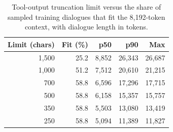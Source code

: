 \begin{table}[t]
\centering
\small
\caption{Tool-output truncation limit versus the share of sampled training dialogues that fit the 8{,}192-token context, with dialogue length in tokens.}
\label{tab:toollimit}
\setlength{\tabcolsep}{4pt}
\begin{tabular}{rrrrr}
\toprule
Limit (chars) & Fit (\%) & p50 & p90 & Max \\
\midrule
1{,}500 & 25.2 & 8{,}852 & 26{,}343 & 26{,}687 \\
1{,}000 & 51.2 & 7{,}512 & 20{,}610 & 21{,}215 \\
700 & 58.8 & 6{,}596 & 17{,}296 & 17{,}715 \\
500 & 58.8 & 6{,}158 & 15{,}357 & 15{,}757 \\
350 & 58.8 & 5{,}503 & 13{,}080 & 13{,}419 \\
250 & 58.8 & 5{,}094 & 11{,}389 & 11{,}827 \\
\bottomrule
\end{tabular}
\par{}
\end{table}
